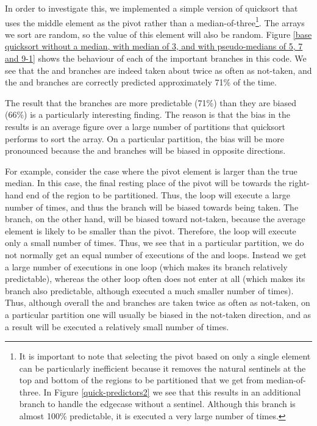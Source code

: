 In order to investigate this, we implemented a simple version of quicksort that
uses the middle element as the pivot rather than a median-of-three\footnote{It
is important to note that selecting the pivot based on only a single element can
be particularly inefficient because it removes the natural sentinels at the top
and bottom of the regions to be partitioned that we get from median-of-three. In
Figure \ref{quick-predictors2} we see that this results in an additional branch
to handle the edgecase without a sentinel. Although this branch is almost 100\%
predictable, it is executed a very large number of times.}. The arrays we sort
are random, so the value of this element will also be random. Figure \ref{base
quicksort without a median, with median of 3, and with pseudo-medians of 5, 7
and 9-1} shows the behaviour of each of the important branches in this code. We
see that the  and  branches are indeed taken about twice as often as
not-taken, and the  and  branches are correctly predicted
approximately 71\% of the time.

The result that the branches are more predictable (71\%) than they are biased
(66\%) is a particularly interesting finding. The reason is that the bias in the
results is an average figure over a large number of partitions that quicksort
performs to sort the array. On a particular partition, the bias will be more
pronounced because the  and  branches will be biased in opposite
directions.

For example, consider the case where the pivot element is larger than the true
median. In this case, the final resting place of the pivot will be towards the
right-hand end of the region to be partitioned. Thus, the  loop will
execute a large number of times, and thus the  branch will be biased
towards being taken. The  branch, on the other hand, will be biased toward
not-taken, because the average element is likely to be smaller than the pivot.
Therefore, the  loop will execute only a small number of times. Thus, we
see that in a particular partition, we do not normally get an equal number of
executions of the  and  loops. Instead we get a large number of
executions in one loop (which makes its branch relatively predictable), whereas
the other loop often does not enter at all (which makes its branch also
predictable, although executed a much smaller number of times). Thus, although
overall the  and  branches are taken twice as often as not-taken, on a
particular partition one will usually be biased in the not-taken direction, and
as a result will be executed a relatively small number of times.

